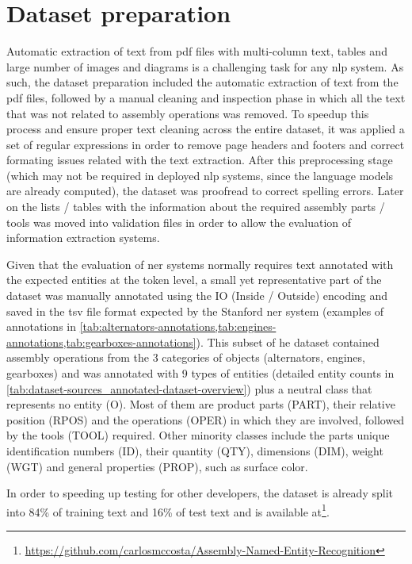 \section{Dataset preparation}\label{sec:dataset-preparation}

Automatic extraction of text from \gls{pdf} files with multi-column text, tables and large number of images and diagrams is a challenging task for any \gls{nlp} system. As such, the dataset preparation included the automatic extraction of text from the \gls{pdf} files, followed by a manual cleaning and inspection phase in which all the text that was not related to assembly operations was removed. To speedup this process and ensure proper text cleaning across the entire dataset, it was applied a set of regular expressions in order to remove page headers and footers and correct formating issues related with the text extraction. After this preprocessing stage (which may not be required in deployed \gls{nlp} systems, since the language models are already computed), the dataset was proofread to correct spelling errors. Later on the lists / tables with the information about the required assembly parts / tools was moved into validation files in order to allow the evaluation of information extraction systems.

Given that the evaluation of \gls{ner} systems normally requires text annotated with the expected entities at the token level, a small yet representative part of the dataset was manually annotated using the IO (Inside / Outside) encoding and saved in the \gls{tsv} file format expected by the Stanford \gls{ner} system (examples of annotations in \cref{tab:alternators-annotations,tab:engines-annotations,tab:gearboxes-annotations}). This subset of he dataset contained assembly operations from the 3 categories of objects (alternators, engines, gearboxes) and was annotated with 9 types of entities (detailed entity counts in \cref{tab:dataset-sources_annotated-dataset-overview}) plus a neutral class that represents no entity (O). Most of them are product parts (PART), their relative position (RPOS) and the operations (OPER) in which they are involved, followed by the tools (TOOL) required. Other minority classes include the parts unique identification numbers (ID), their quantity (QTY), dimensions (DIM), weight (WGT) and general properties (PROP), such as surface color.

In order to speeding up testing for other developers, the dataset is already split into 84\% of training text and 16\% of test text and is available at\footnote{\url{https://github.com/carlosmccosta/Assembly-Named-Entity-Recognition}}.

